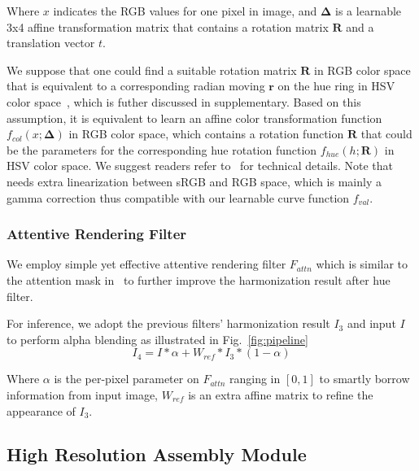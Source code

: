 \documentclass[runningheads]{llncs}
\begin{document}
    Where $x$ indicates the RGB values for one pixel in image, and $\bm{\Delta}$ is a learnable 3x4 affine transformation matrix that contains a rotation matrix $\bm{R}$ and a translation vector $t$.


    We suppose that one could find a suitable rotation matrix $\bm{R}$ in RGB color space that is equivalent to a corresponding radian moving $\bm{r}$ on the hue ring in HSV color space~\cite{haeberli1993matrix}, which is futher discussed in supplementary.
    Based on this assumption, it is equivalent to learn an affine color transformation function $f_{col}(x; \bm{\Delta})$ in RGB color space, which contains a rotation function $\bm{R}$ that could be the parameters for the corresponding hue rotation function $f_{hue}(h; \bm{R})$ in HSV color space.
    We suggest readers refer to~\cite{haeberli1993matrix} for technical details. Note that~~\cite{haeberli1993matrix} needs extra linearization between sRGB and RGB space, which is mainly a gamma correction thus compatible with our learnable curve function $f_{val}$.




\subsubsection{Attentive Rendering Filter} 
    We employ simple yet effective attentive rendering filter $F_{attn}$ which is similar to the attention mask in~\cite{sofiiuk2021foreground} to further improve the harmonization result after hue filter.




    For inference, we adopt the previous filters' harmonization result $I_3$ and input $I$ to perform alpha blending as illustrated in Fig.~\ref{fig:pipeline}
    \begin{equation}
        I_4 = I * \alpha + W_{ref} * I_3 * (1- \alpha)
    \end{equation}
    
    Where $\alpha$ is the per-pixel parameter on $F_{attn}$ ranging in $[0, 1]$ to smartly borrow information from input image, $W_{ref}$ is an extra affine matrix to refine the appearance of $I_3$.
    
    




    
    \subsection{High Resolution Assembly Module} \label{subsection:assembly}
    
\end{document}
